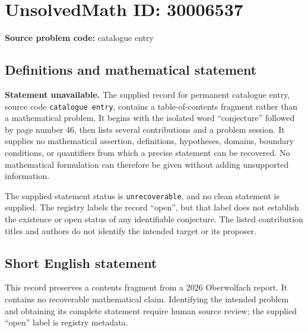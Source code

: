 \documentclass[11pt]{article}
\begin{document}
\section*{UnsolvedMath ID: 30006537}
\textbf{Source problem code:} catalogue entry
\subsection{Definitions and mathematical statement}
\textbf{Statement unavailable.} The supplied record for permanent catalogue entry, source code \texttt{catalogue entry}, contains a table-of-contents fragment rather than a mathematical problem. It begins with the isolated word ``conjecture'' followed by page number 46, then lists several contributions and a problem session. It supplies no mathematical assertion, definitions, hypotheses, domains, boundary conditions, or quantifiers from which a precise statement can be recovered. No mathematical formulation can therefore be given without adding unsupported information.

The supplied statement status is \texttt{unrecoverable}, and no clean statement is supplied. The registry labels the record ``open'', but that label does not establish the existence or open status of any identifiable conjecture. The listed contribution titles and authors do not identify the intended target or its proposer.
\subsection{Short English statement}
This record preserves a contents fragment from a 2026 Oberwolfach report. It contains no recoverable mathematical claim. Identifying the intended problem and obtaining its complete statement require human source review; the supplied ``open'' label is registry metadata.
\end{document}
